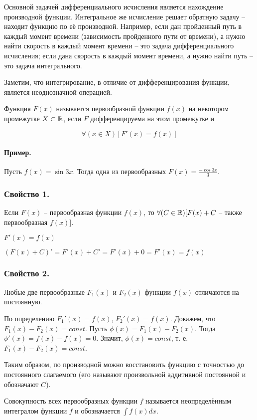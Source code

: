 Основной задачей дифференциального исчисления является нахождение производной функции. Интегральное же исчисление решает обратную задачу -- находит функцию по её производной. Например, если дан пройденный путь в каждый момент времени (зависимость пройденного пути от времени), а нужно найти скорость в каждый момент времени -- это задача дифференциального исчисления; если дана скорость в каждый момент времени, а нужно найти путь -- это задача интегрального.

Заметим, что интегрирование, в отличие от дифференцирования функции, является неоднозначной операцией.

\opred
Функция $F(x)$ называется первообразной функции $f(x)$ на некотором промежутке $X \subset \mathbb{R}$, если $F$ дифференцируема на этом промежутке и 

$$
\forall(x\in X)[F'(x)=f(x)]
$$

\paragraph{Пример.}
Пусть $f(x)=\sin 3x$. Тогда одна из первообразных $F(x)=\frac{-\cos 3x}{3}$.

\subsubsection{Свойство 1.}
Если $F(x)$ -- первообразная функции $f(x)$, то $\forall(C\in\mathbb{R})[F(x)+C$ -- также первообразная $f(x)]$.

\dokvo
$F'(x)=f(x)$

$(F(x)+C)'=F'(x)+C'=F'(x)+0=F'(x)=f(x)$

\dokno

\subsubsection{Свойство 2.}
Любые две первообразные $F_1(x)$ и $F_2(x)$ функции $f(x)$ отличаются на постоянную.

\dokvo

По определению $F_1'(x)=f(x)$, $F_2'(x)=f(x)$.
Докажем, что $F_1(x)-F_2(x)=const$.
Пусть $\phi(x)=F_1(x)-F_2(x)$.
Тогда $\phi'(x)=f(x)-f(x)=0$.
Значит, $\phi(x)=const$, т. е. $F_1(x)-F_2(x)=const$.

\dokno

Таким образом, по производной можно восстановить функцию с точностью до постоянного слагаемого (его называют произвольной аддитивной постоянной и обозначают $C$).

\opred
Совокупность всех первообразных функции $f$ называется неопределённым интегралом функции $f$ и обозначается $\int f(x) dx$.

